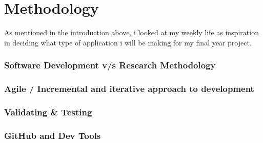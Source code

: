 \chapter{Methodology}
As mentioned in the introduction above, i looked at my weekly life as inspiration in deciding what type of application i will be making for my final year project.
\newline

\subsection{Software Development v/s Research Methodology}

\subsection{Agile / Incremental and iterative approach to development}

\subsection{Validating \& Testing}

\subsection{GitHub and Dev Tools}
